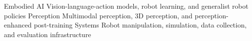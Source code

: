 
\begin{cvskills}
  \cvskill
    {Embodied AI}
    {Vision-language-action models, robot learning, and generalist robot policies}
  \cvskill
    {Perception}
    {Multimodal perception, 3D perception, and perception-enhanced post-training}
  \cvskill
    {Systems}
    {Robot manipulation, simulation, data collection, and evaluation infrastructure}
\end{cvskills}
